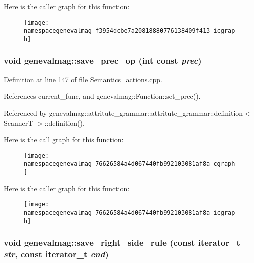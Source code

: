 Here is the caller graph for this function:\nopagebreak
\begin{figure}[H]
\begin{center}
\leavevmode
\texttt{[image: namespacegenevalmag\_f3954dcbe7a20818880776138409f413\_icgraph]}
\end{center}
\end{figure}
\hypertarget{namespacegenevalmag_76626584a4d067440fb992103081af8a}{
\subsubsection[{save\_\-prec\_\-op}]{\setlength{\rightskip}{0pt plus 5cm}void genevalmag::save\_\-prec\_\-op (int const  {\em prec})}}
\label{namespacegenevalmag_76626584a4d067440fb992103081af8a}




Definition at line 147 of file Semantics\_\-actions.cpp.

References current\_\-func, and genevalmag::Function::set\_\-prec().

Referenced by genevalmag::attritute\_\-grammar::attritute\_\-grammar::definition$<$ ScannerT $>$::definition().

Here is the call graph for this function:\nopagebreak
\begin{figure}[H]
\begin{center}
\leavevmode
\texttt{[image: namespacegenevalmag\_76626584a4d067440fb992103081af8a\_cgraph]}
\end{center}
\end{figure}


Here is the caller graph for this function:\nopagebreak
\begin{figure}[H]
\begin{center}
\leavevmode
\texttt{[image: namespacegenevalmag\_76626584a4d067440fb992103081af8a\_icgraph]}
\end{center}
\end{figure}
\hypertarget{namespacegenevalmag_b3b5ed3e86e091b48713f1e3a0065d9c}{
\subsubsection[{save\_\-right\_\-side\_\-rule}]{\setlength{\rightskip}{0pt plus 5cm}void genevalmag::save\_\-right\_\-side\_\-rule (const iterator\_\-t {\em str}, \/  const iterator\_\-t {\em end})}}
\label{namespacegenevalmag_b3b5ed3e86e091b48713f1e3a0065d9c}




